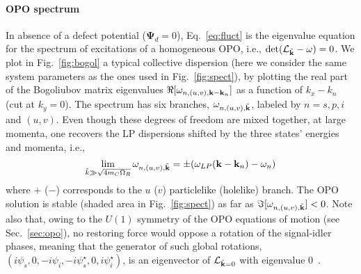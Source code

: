 \paragraph{OPO spectrum}
In absence of a defect potential ($\bm{\Psi}_d =0$),
Eq.~\eqref{eq:fluct} is the eigenvalue equation for the spectrum of
excitations of a homogeneous OPO, i.e.,
$\det(\mathcal{L}_{\tilde{\mathbf{k}}} - \omega)=0$. We plot in
Fig.~\ref{fig:bogol} a typical collective dispersion (here we consider
the same system parameters as the ones used in Fig.~\ref{fig:spect}),
by plotting the real part of the Bogoliubov matrix eigenvalues
$\Re[\omega_{n,(u,v),\mathbf{k}-\mathbf{k}_n}]$ as a function of $k_x - k_n$
(cut at $k_y=0$). The spectrum has six branches,
$\omega_{n,(u,v),\tilde{\mathbf{k}}}$, labeled by $n=s,p,i$ and
$(u,v)$. Even though these degrees of freedom are mixed together, at
large momenta, one recovers the LP dispersions shifted by the three
states' energies and momenta, i.e.,
%
\begin{equation}
  \lim_{\tilde{k} \gg \sqrt{4m_C \Omega_R}} \omega_{n,(u,v),\tilde{\mathbf{k}}} = \pm
  (\omega_{LP}({\mathbf{k} - \mathbf{k}_n}) - \omega_n)
\label{eq:large}
\end{equation}
%
where $+$ ($-$) corresponds to the $u$ ($v$) particlelike (holelike)
branch.
%
The OPO solution is stable (shaded area in Fig.~\ref{fig:spect}) as
far as $\Im[\omega_{n,(u,v),\tilde{\mathbf{k}}}] < 0$. Note also that,
owing to the $U(1)$ symmetry of the OPO equations of motion (see
Sec.~\ref{sec:opo}), no restoring force would oppose a rotation of the
signal-idler phases, meaning that the generator of such global
rotations,
$(i\psi_s,0,-i\psi_i,-i\psi_{s}^{\star},0,i\psi_{i}^{\star})$, is an
eigenvector of $\mathcal{L}_{\tilde{\mathbf{k}} = 0}$ with eigenvalue
$0$~\cite{Wouters_2007}.

